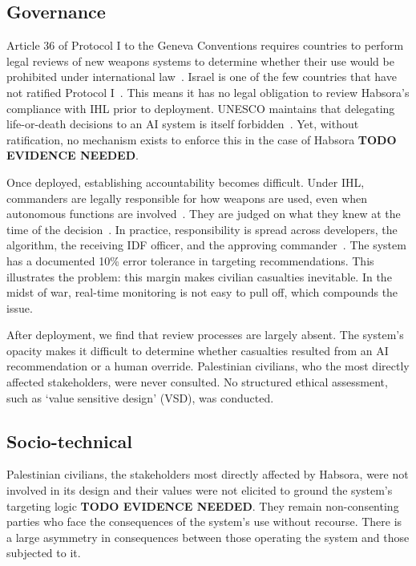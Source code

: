 \subsection{Governance}

Article 36 of Protocol I to the Geneva Conventions requires countries to perform legal reviews of new weapons systems to determine whether their use would be prohibited under international law~\citep{icrc_api_article36_1977}. Israel is one of the few countries that have not ratified Protocol I~\citep{icrc_api_stateparties}. This means it has no legal obligation to review Habsora's compliance with IHL prior to deployment. UNESCO maintains that delegating life-or-death decisions to an AI system is itself forbidden~\citep{aimag.v40i1.2848}. Yet, without ratification, no mechanism exists to enforce this in the case of Habsora \textbf{TODO EVIDENCE NEEDED}.

Once deployed, establishing accountability becomes difficult. Under IHL, commanders are legally responsible for how weapons are used, even when autonomous functions are involved~\citep{icrc_api_article86_1977}. They are judged on what they knew at the time of the decision~\citep{henckaerts2005customary}. In practice, responsibility is spread across developers, the algorithm, the receiving IDF officer, and the approving commander~\citep{aimag.v40i1.2848}. The system has a documented 10\% error tolerance in targeting recommendations. This illustrates the problem: this margin makes civilian casualties inevitable. In the midst of war, real-time monitoring is not easy to pull off, which compounds the issue.

After deployment, we find that review processes are largely absent. The system's opacity makes it difficult to determine whether casualties resulted from an AI recommendation or a human override. Palestinian civilians, who the most directly affected stakeholders, were never consulted. No structured ethical assessment, such as `value sensitive design' (VSD), was conducted.

\subsection{Socio-technical}

Palestinian civilians, the stakeholders most directly affected by Habsora, were not involved in its design and their values were not elicited to ground the system's targeting logic \textbf{TODO EVIDENCE NEEDED}. They remain non-consenting parties who face the consequences of the system's use without recourse. There is a large asymmetry in consequences between those operating the system and those subjected to it.

